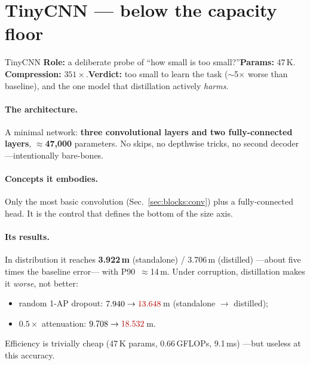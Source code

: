 \section{TinyCNN --- below the capacity floor}
\label{sec:arch:tinycnn}

\begin{ataglance}{TinyCNN}
\textbf{Role:} a deliberate probe of ``how small is too small?''\quad \textbf{Params:} 47\,K.\quad
\textbf{Compression:} $351\times$.\quad \textbf{Verdict:} too small to learn the task ($\sim$5$\times$
worse than baseline), and the one model that distillation actively \emph{harms}.
\end{ataglance}

\paragraph{The architecture.} A minimal network: \textbf{three convolutional layers and two
fully-connected layers}, $\approx$\textbf{47{,}000} parameters. No skips, no depthwise tricks, no
second decoder ---intentionally bare-bones.

\paragraph{Concepts it embodies.} Only the most basic convolution (Sec.~\ref{sec:blocks:conv}) plus a
fully-connected head. It is the control that defines the bottom of the size axis.

\paragraph{Its results.} In distribution it reaches \textbf{3.922\,m} (standalone) / 3.706\,m
(distilled) ---about five times the baseline error--- with P90~$\approx$14\,m. Under corruption,
distillation makes it \emph{worse}, not better:
\begin{itemize}[leftmargin=1.4em,nosep]
  \item random 1-AP dropout: $7.940\to\worst{13.648}$\,m (standalone $\to$ distilled);
  \item $0.5\times$ attenuation: $9.708\to\worst{18.532}$\,m.
\end{itemize}
Efficiency is trivially cheap (47\,K params, 0.66\,GFLOPs, 9.1\,ms) ---but useless at this accuracy.

